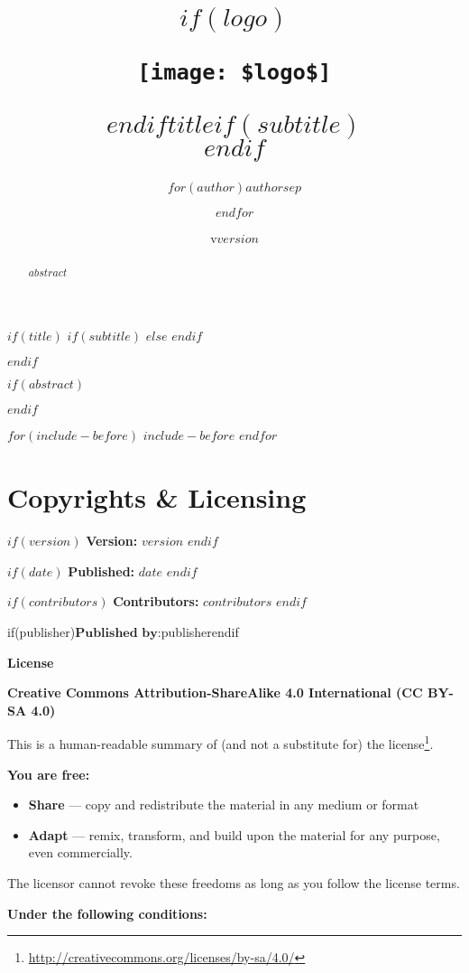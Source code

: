 \documentclass[$if(fontsize)$$fontsize$,$endif$$if(lang)$$lang$,$endif$$if(papersize)$$papersize$,$endif$$for(classoption)$$classoption$$sep$,$endfor$,openany,twoside]{$documentclass$}
\title{$if(logo)$\begin{center}\texttt{[image: \$logo\$]}\end{center}\vspace{\baselineskip}$endif$\Huge $title$$if(subtitle)$\\\vspace{0.5em}{\LARGE $subtitle$}$endif$}
\author{$for(author)$$author$$sep$ \and $endfor$}
\date{v$version$}
\renewcommand{\href}[2]{#2\footnote{\url{#1}}}
\begin{document}
$if(title)$
  \makeatletter
  $if(subtitle)$
  $else$
  $endif$
  \makeatother
  \maketitle
  \clearpage
$endif$


$if(abstract)$
  \begin{abstract}
  $abstract$
  \end{abstract}
  \clearpage
$endif$

$for(include-before)$
  $include-before$
$endfor$

\pagestyle{licensepage}

\section{Copyrights \& Licensing}\label{copyrights-licensing}

$if(version)$
  \textbf{Version:} $version$
$endif$

$if(date)$
  \textbf{Published:} $date$
$endif$

$if(contributors)$
  \textbf{Contributors:} $contributors$
$endif$

if(publisher)$
  \textbf{Published by:} $publisher$
$endif

\vspace{10 mm}

\textbf{License}

\textbf{Creative Commons Attribution-ShareAlike 4.0 International (CC BY-SA 4.0)}

This is a human-readable summary of (and not a substitute for) the \href{http://creativecommons.org/licenses/by-sa/4.0/}{license}.

\textbf{You are free:}

\begin{itemize}
\item
  \textbf{Share} --- copy and redistribute the material in any medium or format
\item
  \textbf{Adapt} --- remix, transform, and build upon the material for any
  purpose, even commercially.
\end{itemize}

The licensor cannot revoke these freedoms as long as you follow the license terms.

\textbf{Under the following conditions:}
\end{document}
